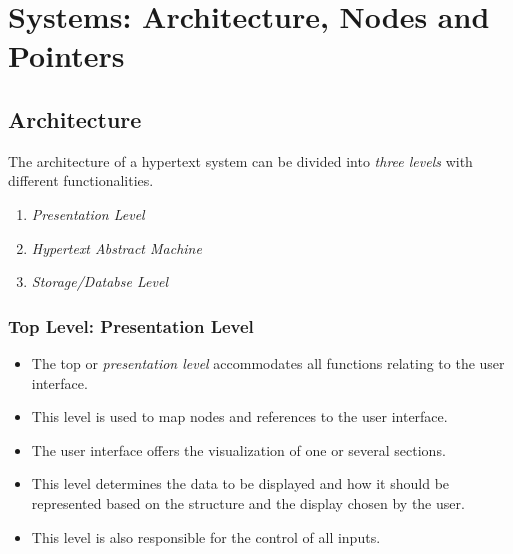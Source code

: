 \section{Systems: Architecture, Nodes and Pointers}

\subsection{Architecture}
The architecture of a hypertext system can be divided into \textit{three levels} with different functionalities.

\begin{multicols}{2}
	\begin{enumerate}
		\item \textit{Presentation Level}
		\item \textit{Hypertext Abstract Machine} 
		\item \textit{Storage/Databse Level}
	\end{enumerate}
\end{multicols}

\subsubsection[Presentation Level]{Top Level: Presentation Level}
\begin{multicols}{2}
	\begin{itemize}
		\item The top or \textit{presentation level} accommodates all functions relating to the user interface. 
		\item This level is used to map nodes and references to the user interface. 
		\item The user interface offers the visualization of one or several sections. 
		\item This level determines the data to be displayed and how it should be represented based on the structure and the display chosen by the user.
		\item This level is also responsible for the control of all inputs.
	\end{itemize}
\end{multicols}


